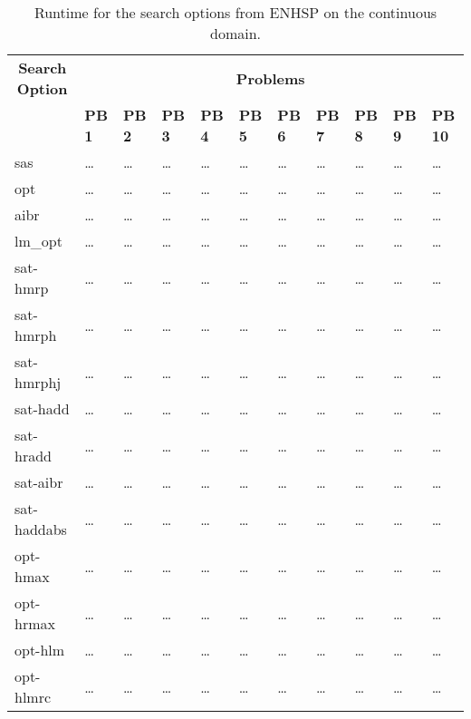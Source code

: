 \begin{sidewaystable}
  \centering
  \caption{Runtime for the search options from ENHSP on the continuous domain.}\label{tab:continuous-experiment-results}
  \begin{tabular}{p{3cm} *{10}{p{1.523cm}}}
      \toprule
      \multicolumn{1}{c}{\textbf{Search Option}} & \multicolumn{10}{c}{\textbf{Problems}} \\
      \cmidrule(lr){2-11}
      & \textbf{PB 1} & \textbf{PB 2} & \textbf{PB 3} & \textbf{PB 4} & \textbf{PB 5} & \textbf{PB 6} & \textbf{PB 7} & \textbf{PB 8} & \textbf{PB 9} & \textbf{PB 10} \\
      \midrule
      sas & \dots & \dots & \dots & \dots & \dots & \dots & \dots & \dots & \dots & \dots \\
      opt & \dots & \dots & \dots & \dots & \dots & \dots & \dots & \dots & \dots & \dots \\
      aibr & \dots & \dots & \dots & \dots & \dots & \dots & \dots & \dots & \dots & \dots \\
      lm\_opt & \dots & \dots & \dots & \dots & \dots & \dots & \dots & \dots & \dots & \dots \\
      sat-hmrp & \dots & \dots & \dots & \dots & \dots & \dots & \dots & \dots & \dots & \dots \\
      sat-hmrph & \dots & \dots & \dots & \dots & \dots & \dots & \dots & \dots & \dots & \dots \\
      sat-hmrphj & \dots & \dots & \dots & \dots & \dots & \dots & \dots & \dots & \dots & \dots \\
      sat-hadd & \dots & \dots & \dots & \dots & \dots & \dots & \dots & \dots & \dots & \dots \\
      sat-hradd & \dots & \dots & \dots & \dots & \dots & \dots & \dots & \dots & \dots & \dots \\
      sat-aibr & \dots & \dots & \dots & \dots & \dots & \dots & \dots & \dots & \dots & \dots \\
      sat-haddabs & \dots & \dots & \dots & \dots & \dots & \dots & \dots & \dots & \dots & \dots \\
      opt-hmax & \dots & \dots & \dots & \dots & \dots & \dots & \dots & \dots & \dots & \dots \\
      opt-hrmax & \dots & \dots & \dots & \dots & \dots & \dots & \dots & \dots & \dots & \dots \\
      opt-hlm & \dots & \dots & \dots & \dots & \dots & \dots & \dots & \dots & \dots & \dots \\
      opt-hlmrc & \dots & \dots & \dots & \dots & \dots & \dots & \dots & \dots & \dots & \dots \\
      \bottomrule
  \end{tabular}
\end{sidewaystable}
